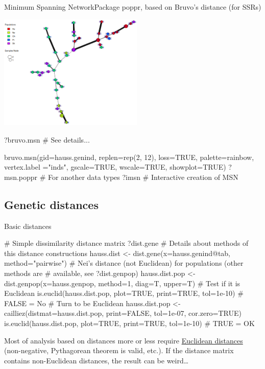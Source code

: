 \documentclass[compress, ucs, xelatex, 11pt, xcolor=svgnames, aspectratio=169,
	hyperref={
		bookmarks=true,
		unicode=true,
		colorlinks=true,
		pdftitle={Molecular data in R},
		plainpages=false,
		pdfauthor={Vojtech Zeisek},
		pdfsubject={Course about phylogeny and evolution in R},
		pdfcreator={XeLaTeX},
		pdfkeywords={R, evolution, phylogeny, molecular data},
		linkcolor=Crimson, %
		anchorcolor=Magenta, %
		citecolor=Magenta, %
		filecolor=Magenta, %
		menucolor=Magenta, %
		urlcolor=DodgerBlue, %
		pdftex},
	url={hyphens, lowtilde} %
	]{beamer}
\renewcommand{\texttt}[1]{\colorbox{Beige}{{\ttfamily #1}}}
\begin{document}
\begin{frame}[fragile]{Minimum Spanning Network}{Package poppr, based on Bruvo's distance (for SSRs)}
	\label{MSN}
	\begin{multicols}{2}
		\begin{center}
			\includegraphics[height=5.5cm]{msn.png}
		\end{center}
		\begin{spluscode}
    ?bruvo.msn # See details...
		\end{spluscode}
		\columnbreak
		\begin{spluscode}
    bruvo.msn(gid=hauss.genind,
      replen=rep(2, 12), loss=TRUE,
      palette=rainbow, vertex.label
      ="inds", gscale=TRUE,
      wscale=TRUE, showplot=TRUE)
    ?msn.poppr # For another data types
    ?imsn # Interactive creation of MSN
		\end{spluscode}
		\begin{center}
			\texttt{[image: msn-bruvo\_no\_labels.png]}
		\end{center}
	\end{multicols}
\end{frame}

\subsection{Genetic distances}

\begin{frame}[fragile]{Basic distances}
	\label{distances}
	\begin{spluscode}
    # Simple dissimilarity distance matrix
    ?dist.gene # Details about methods of this distance constructions
    hauss.dist <- dist.gene(x=hauss.genind@tab, method="pairwise")
    # Nei's distance (not Euclidean) for populations (other methods are
    # available, see ?dist.genpop)
    hauss.dist.pop <- dist.genpop(x=hauss.genpop, method=1, diag=T, upper=T)
    # Test if it is Euclidean
    is.euclid(hauss.dist.pop, plot=TRUE, print=TRUE, tol=1e-10) # FALSE = No
    # Turn to be Euclidean
    hauss.dist.pop <- cailliez(distmat=hauss.dist.pop, print=FALSE, tol=1e-07,
      cor.zero=TRUE)
    is.euclid(hauss.dist.pop, plot=TRUE, print=TRUE, tol=1e-10) # TRUE = OK
	\end{spluscode}
	\vfil
	Most of analysis based on distances more or less require \href{https://en.wikipedia.org/wiki/Euclidean_distance_matrix}{Euclidean distances} (non-negative, Pythagorean theorem is valid, etc.). If the distance matrix contains non-Euclidean distances, the result can be weird\ldots
	\vfill
\end{frame}
\end{document}
